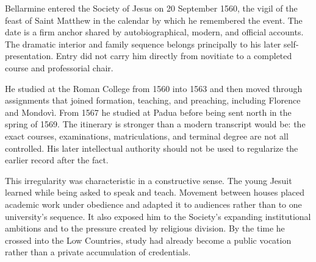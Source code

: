 Bellarmine entered the Society of Jesus on 20 September 1560, the vigil of the
feast of Saint Matthew in the calendar by which he remembered the event.  The
date is a firm anchor shared by autobiographical, modern, and official
accounts.  The dramatic interior and family sequence belongs principally to
his later self-presentation.  Entry did not carry him directly from novitiate
to a completed course and professorial chair.

He studied at the Roman College from 1560 into 1563 and then moved through
assignments that joined formation, teaching, and preaching, including Florence
and Mondovì.  From 1567 he studied at Padua before being sent north in the
spring of 1569.  The itinerary is stronger than a modern transcript would be:
the exact courses, examinations, matriculations, and terminal degree are not
all controlled.  His later intellectual authority should not be used to
regularize the earlier record after the fact.

This irregularity was characteristic in a constructive sense.  The young
Jesuit learned while being asked to speak and teach.  Movement between houses
placed academic work under obedience and adapted it to audiences rather than
to one university's sequence.  It also exposed him to the Society's expanding
institutional ambitions and to the pressure created by religious division.
By the time he crossed into the Low Countries, study had already become a
public vocation rather than a private accumulation of credentials.

